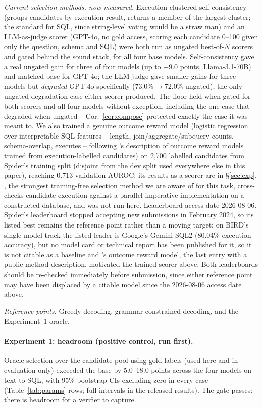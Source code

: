 \documentclass[11pt]{article}
\begin{document}
\emph{Current selection methods, now measured.} Execution-clustered self-consistency (groups candidates by execution result, returns a member of the largest cluster; the standard for SQL, since string-level voting \citep{wang2023self} would be a straw man) and an LLM-as-judge scorer (GPT-4o, no gold access, scoring each candidate 0--100 given only the question, schema and SQL) were both run as ungated best-of-$N$ scorers and gated behind the sound stack, for all four base models. Self-consistency gave a real ungated gain for three of four models (up to $+9.0$ points, Llama-3.1-70B) and matched base for GPT-4o; the LLM judge gave smaller gains for three models but \emph{degraded} GPT-4o specifically (73.0\%$\to$72.0\% ungated), the only ungated-degradation case either scorer produced. The floor held when gated for both scorers and all four models without exception, including the one case that degraded when ungated -- Cor.~\ref{cor:compose} protected exactly the case it was meant to. We also trained a genuine outcome reward model (logistic regression over interpretable SQL features -- length, join/aggregate/subquery counts, schema-overlap, executes -- following \citet{gradesql2026}'s description of outcome reward models trained from execution-labelled candidates) on 2{,}700 labelled candidates from Spider's training split (disjoint from the dev split used everywhere else in this paper), reaching 0.713 validation AUROC; its results as a scorer are in \S\ref{sec:exp}. \citet{dpc2026}, the strongest training-free selection method we are aware of for this task, cross-checks candidate execution against a parallel imperative implementation on a constructed database, and was not run here. Leaderboard access date 2026-08-06. Spider's leaderboard stopped accepting new submissions in February 2024, so its listed best remains the reference point rather than a moving target; on BIRD's single-model track the listed leader is Google's Gemini-SQL2 (80.04\% execution accuracy), but no model card or technical report has been published for it, so it is not citable as a baseline and \citet{gradesql2026}'s outcome reward model, the last entry with a public method description, motivated the trained scorer above. Both leaderboards should be re-checked immediately before submission, since either reference point may have been displaced by a citable model since the 2026-08-06 access date above.

\emph{Reference points.} Greedy decoding, grammar-constrained decoding, and the Experiment~1 oracle.

\paragraph{Experiment 1: headroom (positive control, run first).} Oracle selection over the candidate pool using gold labels (used here and in evaluation only) exceeded the base by 5.0--18.0 points across the four models on text-to-SQL, with 95\% bootstrap CIs excluding zero in every case (Table~\ref{tab:params} rows; full intervals in the released results). The gate passes: there is headroom for a verifier to capture.
\end{document}
